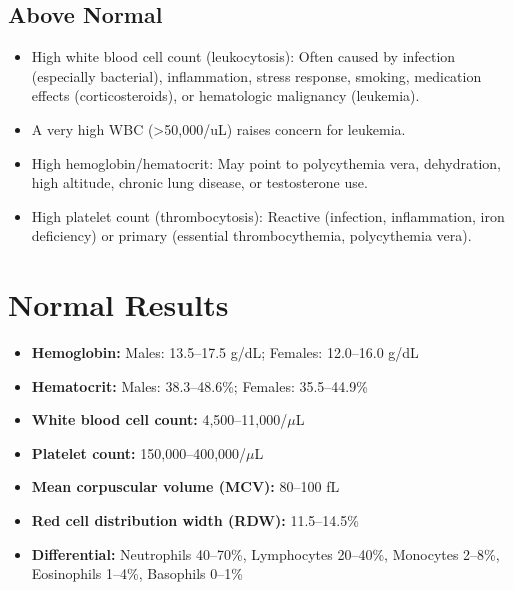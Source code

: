 \subsection*{Above Normal}
\begin{itemize}
  \item High white blood cell count (leukocytosis): Often caused by infection (especially bacterial), inflammation, stress response, smoking, medication effects (corticosteroids), or hematologic malignancy (leukemia).
  \item A very high WBC (>50,000/uL) raises concern for leukemia.
  \item High hemoglobin/hematocrit: May point to polycythemia vera, dehydration, high altitude, chronic lung disease, or testosterone use.
  \item High platelet count (thrombocytosis): Reactive (infection, inflammation, iron deficiency) or primary (essential thrombocythemia, polycythemia vera).
\end{itemize}

\section*{Normal Results}
\begin{itemize}
  \item \textbf{Hemoglobin:} Males: 13.5--17.5 g/dL; Females: 12.0--16.0 g/dL
  \item \textbf{Hematocrit:} Males: 38.3--48.6\%; Females: 35.5--44.9\%
  \item \textbf{White blood cell count:} 4,500--11,000/$\mu$L
  \item \textbf{Platelet count:} 150,000--400,000/$\mu$L
  \item \textbf{Mean corpuscular volume (MCV):} 80--100 fL
  \item \textbf{Red cell distribution width (RDW):} 11.5--14.5\%
  \item \textbf{Differential:} Neutrophils 40--70\%, Lymphocytes 20--40\%, Monocytes 2--8\%, Eosinophils 1--4\%, Basophils 0--1\%
\end{itemize}

